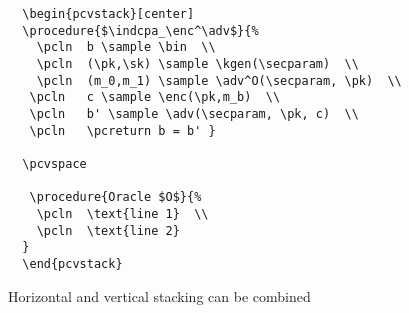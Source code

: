 \documentclass[a4paper]{report}
\begin{document}
  
  \begin{lstlisting}
  \begin{pcvstack}[center]
  \procedure{$\indcpa_\enc^\adv$}{%
	\pcln  b \sample \bin  \\
	\pcln  (\pk,\sk) \sample \kgen(\secparam)  \\
	\pcln  (m_0,m_1) \sample \adv^O(\secparam, \pk)  \\
   \pcln   c \sample \enc(\pk,m_b)  \\
   \pcln   b' \sample \adv(\secparam, \pk, c)  \\
   \pcln   \pcreturn b = b' }
  
  \pcvspace
  
   \procedure{Oracle $O$}{%
	\pcln  \text{line 1}  \\
	\pcln  \text{line 2}  
  }
  \end{pcvstack}
  \end{lstlisting}
  
  
  Horizontal and vertical stacking can be combined
  \begin{pchstack}[center]
  
  \begin{pcvstack}%
  
  \pcvspace
  
  \begin{pchstack}
  
  
  \end{pchstack}
  \end{pcvstack}
  
  \pchspace
  
  
  \end{pchstack}
  
\end{document}
